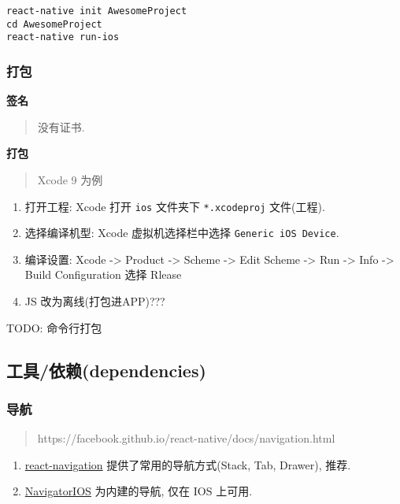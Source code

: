 \begin{lstlisting}
react-native init AwesomeProject
cd AwesomeProject
react-native run-ios
\end{lstlisting}

\subsubsection{打包}\label{ux6253ux5305-1}

\textbf{签名}

\begin{quote}
没有证书.
\end{quote}

\textbf{打包}

\begin{quote}
Xcode 9 为例
\end{quote}

\begin{enumerate}
\def\labelenumi{\arabic{enumi}.}
\tightlist
\item
  打开工程: Xcode 打开 \lstinline!ios! 文件夹下 \lstinline!*.xcodeproj!
  文件(工程).
\item
  选择编译机型: Xcode 虚拟机选择栏中选择 \lstinline!Generic iOS Device!.
\item
  编译设置: Xcode -\textgreater{} Product -\textgreater{} Scheme
  -\textgreater{} Edit Scheme -\textgreater{} Run -\textgreater{} Info
  -\textgreater{} Build Configuration 选择 Rlease
\item
  JS 改为离线(打包进APP)???
\end{enumerate}

TODO: 命令行打包

\subsection{工具/依赖(dependencies)}\label{ux5de5ux5177ux4f9dux8d56dependencies}

\subsubsection{导航}\label{ux5bfcux822a}

\begin{quote}
https://facebook.github.io/react-native/docs/navigation.html
\end{quote}

\begin{enumerate}
\def\labelenumi{\arabic{enumi}.}
\tightlist
\item
  \href{https://github.com/react-navigation/react-navigation}{react-navigation}
  提供了常用的导航方式(Stack, Tab, Drawer), 推荐.
\item
  \href{https://facebook.github.io/react-native/docs/navigatorios.html}{NavigatorIOS}
  为内建的导航, 仅在 IOS 上可用.
\end{enumerate}

